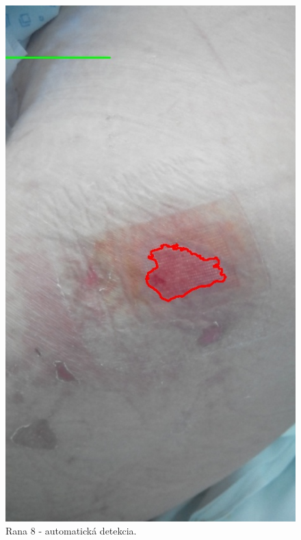 \begin{figure}[h]
\begin{minipage}{0.48\textwidth}
     \includegraphics[scale=0.35]{fig/8a.jpeg}
      \caption{Rana 8 - automatická detekcia.}
      \label{fig:w8d}
   \end{minipage}
\end{figure}

